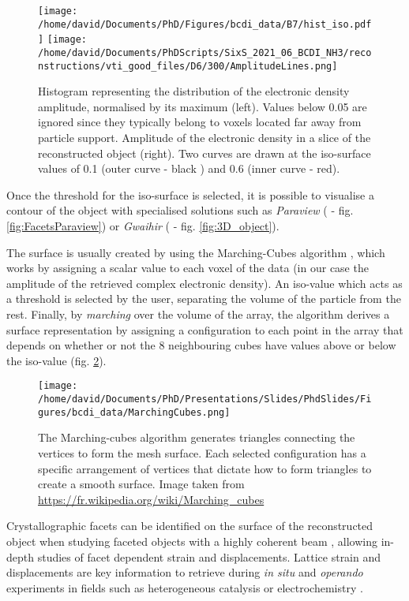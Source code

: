 \begin{figure}[!htb]
   \centering
   \texttt{[image: /home/david/Documents/PhD/Figures/bcdi\_data/B7/hist\_iso.pdf]}
   \texttt{[image: /home/david/Documents/PhDScripts/SixS\_2021\_06\_BCDI\_NH3/reconstructions/vti\_good\_files/D6/300/AmplitudeLines.png]}
   \caption{
   Histogram representing the distribution of the electronic density amplitude, normalised by its maximum (left).
   Values below 0.05 are ignored since they typically belong to voxels located far away from particle support.
   Amplitude of the electronic density in a slice of the reconstructed object (right).
   Two curves are drawn at the iso-surface values of \num{0.1} (outer curve - black ) and \num{0.6} (inner curve - red).
   }
   \label{fig:histo}
\end{figure}

Once the threshold for the iso-surface is selected, it is possible to visualise a contour of the object with specialised solutions such as \textit{Paraview} (\cite{Ahrens2001} - fig. \ref{fig:FacetsParaview}) or \textit{Gwaihir} (\cite{Simonne2022} - fig. \ref{fig:3D_object}).

The surface is usually created by using the Marching-Cubes algorithm \parencite{Lorensen1987}, which works by assigning a scalar value to each voxel of the data (in our case the amplitude of the retrieved complex electronic density).
An iso-value which acts as a threshold is selected by the user, separating the volume of the particle from the rest.
Finally, by \textit{marching} over the volume of the array, the algorithm derives a surface representation by assigning a configuration to each point in the array that depends on whether or not the 8 neighbouring cubes have values above or below the iso-value (fig. \ref{fig:MarchingCubes}).

\begin{figure}[!htb]
    \centering
    \texttt{[image: /home/david/Documents/PhD/Presentations/Slides/PhdSlides/Figures/bcdi\_data/MarchingCubes.png]}
    \caption{
    The Marching-cubes algorithm generates triangles connecting the vertices to form the mesh surface.
    Each selected configuration has a specific arrangement of vertices that dictate how to form triangles to create a smooth surface.
    Image taken from \url{https://fr.wikipedia.org/wiki/Marching_cubes}
    }
    \label{fig:MarchingCubes}
\end{figure}

Crystallographic facets can be identified on the surface of the reconstructed object when studying faceted objects with a highly coherent beam \parencite{Richard2018}, allowing in-depth studies of facet dependent strain and displacements.
Lattice strain and displacements are key information to retrieve during \textit{in situ} and \textit{operando} experiments in fields such as heterogeneous catalysis \parencite{Ulvestad2016, Yau2017a, Kim2018, Fernandez2019, Abuin2019, Kim2019, Kawaguchi2019, Suzana2019, Choi2020, Passos2020,  Kim2021, Carnis2021, Dupraz2022} or electrochemistry \parencite{Ulvestad2015a, Bjorling2019, Vicente2021, Kawaguchi2021, Carnis2021b, Atlan2023}.

